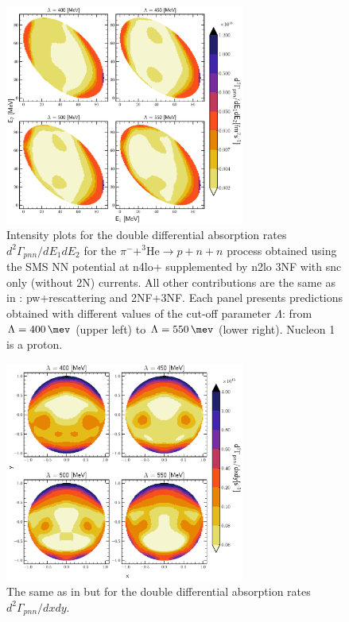     \begin{figure}[h]
        \begin{center}
        \includegraphics[width=0.7\textwidth]{PlotData/PION/Dalitz_maps/figures/Dalitz_map_pnn_E1E2_cutofs_1NC.pdf}
        \end{center}
        \caption{Intensity plots for the double differential absorption rates
        $d^2 \Gamma_{pnn}/dE_1dE_2$ for the $\pi^- + ^3\text{He} \rightarrow p + n + n$
        process obtained using the SMS NN potential at \gls{n4lo+} supplemented by \gls{n2lo} 3NF
        with \gls{snc} only (without 2N) currents.
        All other contributions are the same as in : \gls{pw}+rescattering and 2NF+3NF.
        Each panel presents predictions obtained with different values of the cut-off parameter $\Lambda$:
        from $\Lambda = \SI{400}{\mev}$ (upper left) to $\Lambda = \SI{550}{\mev}$ (lower right). Nucleon 1 is a proton.}
        \label{pion_map_E1E2_cutoff_1NC}
    \end{figure}

    \begin{figure}[h]
        \begin{center}
        \includegraphics[width=0.7\textwidth]{PlotData/PION/Dalitz_maps/figures/Dalitz_map_pnn_xy_cutofs_1NC.pdf}
        \end{center}
        \caption{The same as in  but for the double differential absorption rates
        $d^2 \Gamma_{pnn}/dxdy$.}
        \label{pion_map_xy_cutoff_1NC}
    \end{figure}

